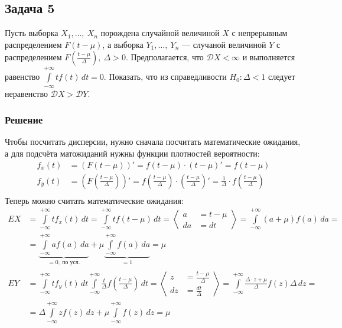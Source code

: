 \documentclass[12pt, a4paper]{article}
\newcommand{\dev}{\mathcal{D}}
\newcommand{\oo}{\infty}
\begin{document}
\subsection*{Задача 5}
Пусть выборка $X_1,\dots,\ X_n$ порождена случайной величиной $X$ с непрерывным распределением $F(t - \mu)$, а выборка $Y_1,\dots,\ Y_n$ --- случаной величиной $Y$ с распределением $F\left( \frac{t - \mu}{\Delta} \right),\ \Delta > 0$. Предполагается, что $\dev X < \infty$ и выполняется равенство $\displaystyle \int\limits_{-\infty}^{+\infty} t f(t)\, dt = 0$. Показать, что из справедливости $H_0: \Delta < 1$ следует неравенство $\dev X > \dev Y$.
\subsubsection*{Решение}
Чтобы посчитать дисперсии, нужно сначала посчитать математические ожидания, а для подсчёта матожиданий нужны функции плотностей вероятности:
\begin{equation*}
    \begin{aligned}
        f_{x}(t) &= \left( F(t - \mu) \right)' = f(t - \mu)\cdot\left( t - \mu \right)' = f(t - \mu)\\
        f_{y}(t) &= \left( F\left(\frac{t - \mu}{\Delta}\right) \right)' = f\left(\frac{t - \mu}{\Delta}\right)\cdot\left(\frac{t - \mu}{\Delta}\right)' = \frac{1}{\Delta}\cdot f\left(\frac{t - \mu}{\Delta}\right)\\
    \end{aligned}
\end{equation*}
Теперь можно считать математические ожидания:
\begin{equation*}
    \begin{aligned}
        EX &= \int\limits_{-\infty}^{+\infty} tf_{x}(t)\, dt = \int\limits_{-\infty}^{+\infty} t f(t - \mu)\, dt = \left< \begin{aligned}
            a &= t - \mu\\
            da &= dt
        \end{aligned} \right> = \int\limits_{-\oo}^{+\oo} (a + \mu) f(a)\, da =\\
        &= \underset{=0,\ \text{по усл.}}{\underbrace{\int\limits_{-\oo}^{+\oo} af(a)\, da}} + \mu \underset{=1}{\underbrace{\int\limits_{-\oo}^{+\oo} f(a)\, da}} = \mu\\
        EY &= \int\limits_{-\infty}^{+\infty} tf_{y}(t)\, dt \int\limits_{-\infty}^{+\infty} \frac{t}{\Delta} f\left( \frac{t - \mu}{\Delta} \right)\, dt = \left< \begin{aligned}
            z &= \frac{t - \mu}{\Delta}\\
            dz &= \frac{dt}{\Delta}
        \end{aligned} \right> = \int\limits_{-\infty}^{+\infty} \frac{\Delta \cdot z + \mu}{\Delta} f(z)\Delta \, dz =\\
        &= \Delta\int\limits_{-\infty}^{+\infty} zf(z)\, dz + \mu\int\limits_{-\infty}^{+\infty} f(z)\, dz = \mu
    \end{aligned}
\end{equation*}
\end{document}
